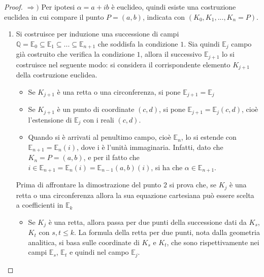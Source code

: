 \begin{proof}
$\Rightarrow)$ Per ipotesi $\alpha = a+ ib$ è euclideo, quindi esiste una costruzione euclidea in cui compare il punto $P = (a,b)$, indicata con $(K_0, K_1, ..., K_n = P)$. 

\begin{enumerate}

\item Si costruisce per induzione una successione di campi $\mathbb{Q} = \mathbb{E}_0 \subseteq \mathbb{E}_1 \subseteq ... \subseteq  \mathbb{E}_{n+1}$ che soddisfa la condizione $1$. Sia quindi $\mathbb{E}_j$ campo già costruito che verifica la condizione $1$, allora il successivo $\mathbb{E}_{j+1}$ lo si costruisce nel seguente modo: si considera il corrispondente elemento $K_{j+1}$ della costruzione euclidea.

\begin{itemize}

\item Se $K_{j+1}$ è una retta o una circonferenza, si pone $\mathbb{E}_{j+1}=\mathbb{E}_{j}$

\item Se $K_{j+1}$ è un punto di coordinate $(c,d)$, si pone  $\mathbb{E}_{j+1}=\mathbb{E}_{j}(c,d)$, cioè l'estensione di $\mathbb{E}_{j}$ con i reali $(c,d)$.

\item Quando si è arrivati al penultimo campo, cioè $\mathbb{E}_{n}$, lo si estende con $\mathbb{E}_{n+1}=\mathbb{E}_{n}(i)$, dove i è l'unità immaginaria. Infatti, dato che $K_n = P = (a,b)$, e per il fatto che $i \in \mathbb{E}_{n+1}=\mathbb{E}_{n}(i) = \mathbb{E}_{n-1}(a,b)(i)$, si ha che $\alpha \in \mathbb{E}_{n+1}$.

\end{itemize}

Prima di affrontare la dimostrazione del punto $2$ si prova che, se $K_{j}$ è una retta o una circonferenza allora la sua equazione cartesiana può essere scelta a coefficienti in $\mathbb{E}_k$

\begin{itemize}

\item Se $K_{j}$ è una retta, allora passa per due punti della successione dati da $K_{s}$,  $K_{t}$ con $s,t \leq k$. La formula della retta per due punti, nota dalla geometria analitica, si basa sulle coordinate di $K_{s}$ e $K_{t}$, che sono rispettivamente nei campi $\mathbb{E}_s$, $\mathbb{E}_t$ e quindi nel campo $\mathbb{E}_j$.


\end{itemize}
\end{enumerate}
\end{proof}
